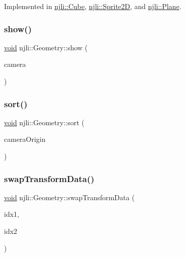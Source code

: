 Implemented in \mbox{\hyperlink{classnjli_1_1_cube_ae9b5fd0928a0e47ad37114ca9da6f41a}{njli\+::\+Cube}}, \mbox{\hyperlink{classnjli_1_1_sprite2_d_a7815fc6f5a2174a560721310fa4bd92f}{njli\+::\+Sprite2D}}, and \mbox{\hyperlink{classnjli_1_1_plane_a0ba9fe9f6a03a8438d6204520776250b}{njli\+::\+Plane}}.

\mbox{\label{classnjli_1_1_geometry_a2778a40635e95c7c7059aa7ce9007290}} 
\subsubsection{\texorpdfstring{show()}{show()}}
{\footnotesize\ttfamily \mbox{\hyperlink{_thread_8h_af1e856da2e658414cb2456cb6f7ebc66}{void}} njli\+::\+Geometry\+::show (\begin{DoxyParamCaption}\item[{\mbox{\hyperlink{classnjli_1_1_camera}{Camera}} $\ast$}]{camera }\end{DoxyParamCaption})}

\mbox{\label{classnjli_1_1_geometry_a60f8058a4afac8cfe23aa33ae1382fbd}} 
\subsubsection{\texorpdfstring{sort()}{sort()}}
{\footnotesize\ttfamily \mbox{\hyperlink{_thread_8h_af1e856da2e658414cb2456cb6f7ebc66}{void}} njli\+::\+Geometry\+::sort (\begin{DoxyParamCaption}\item[{const bt\+Vector3 \&}]{camera\+Origin }\end{DoxyParamCaption})}

\mbox{\label{classnjli_1_1_geometry_a67fcd3f18e15e7da88bc070eb7dca337}} 
\subsubsection{\texorpdfstring{swap\+Transform\+Data()}{swapTransformData()}}
{\footnotesize\ttfamily \mbox{\hyperlink{_thread_8h_af1e856da2e658414cb2456cb6f7ebc66}{void}} njli\+::\+Geometry\+::swap\+Transform\+Data (\begin{DoxyParamCaption}\item[{const size\+\_\+t}]{idx1,  }\item[{const size\+\_\+t}]{idx2 }\end{DoxyParamCaption})\hspace{0.3cm}{\ttfamily [private]}}

